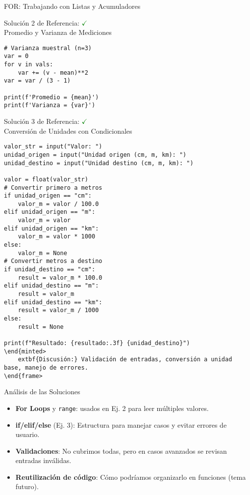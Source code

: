 \documentclass[10pt]{beamer}
\begin{document}
\begin{frame}[fragile]{FOR: Trabajando con Listas y Acumuladores}
\begin{frame}[fragile]{Solución 2 de Referencia: \hfill \textcolor{green}{$\checkmark$} \\ Promedio y Varianza de Mediciones}
\begin{verbatim}
# Varianza muestral (n=3)
var = 0
for v in vals:
    var += (v - mean)**2
var = var / (3 - 1)

print(f'Promedio = {mean}')
print(f'Varianza = {var}')
\end{verbatim}
\end{frame}

\begin{frame}[fragile]{Solución 3 de Referencia: \hfill \textcolor{green}{$\checkmark$} \\ Conversión de Unidades con Condicionales}
\begin{verbatim}
valor_str = input("Valor: ")
unidad_origen = input("Unidad origen (cm, m, km): ")
unidad_destino = input("Unidad destino (cm, m, km): ")

valor = float(valor_str)
# Convertir primero a metros
if unidad_origen == "cm":
    valor_m = valor / 100.0
elif unidad_origen == "m":
    valor_m = valor
elif unidad_origen == "km":
    valor_m = valor * 1000
else:
    valor_m = None
# Convertir metros a destino
if unidad_destino == "cm":
    result = valor_m * 100.0
elif unidad_destino == "m":
    result = valor_m
elif unidad_destino == "km":
    result = valor_m / 1000
else:
    result = None

print(f"Resultado: {resultado:.3f} {unidad_destino}")
\end{minted>
	extbf{Discusión:} Validación de entradas, conversión a unidad base, manejo de errores.
\end{frame>
\end{verbatim}
\end{frame}

\begin{frame}{Análisis de las Soluciones}
  \begin{itemize}
    \item \textbf{For Loops} y \texttt{range}: usados en Ej. 2 para leer múltiples valores.
    \item \textbf{if/elif/else} (Ej. 3): Estructura para manejar casos y evitar errores de usuario.
    \item \textbf{Validaciones}: No cubrimos todas, pero en casos avanzados se revisan entradas inválidas.
    \item \textbf{Reutilización de código}: Cómo podríamos organizarlo en funciones (tema futuro).
  \end{itemize}
\end{frame}


\end{frame}
\end{document}
